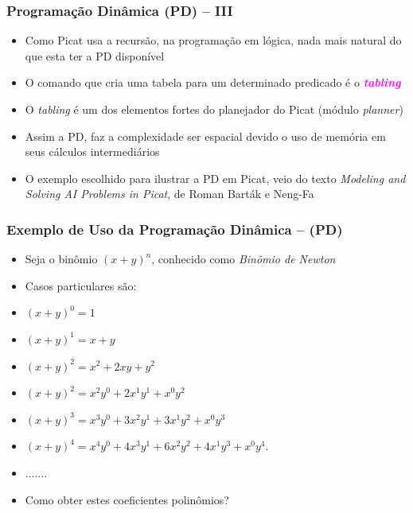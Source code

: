 \begin{frame}[fragile]

    \frametitle{Programação Dinâmica (PD) -- III}

   \begin{block}{}
     \begin{itemize}

      \item Como Picat usa a recursão, na programação em lógica, nada mais
      natural do que esta ter a PD disponível 

       \pause
       \item O comando que cria uma tabela para um determinado predicado é o  \textcolor{magenta}{\textbf{\textit{tabling}}}
 
        \pause
       \item O \textit{tabling}  é um dos elementos fortes do planejador do Picat (módulo \textit{planner})

        \pause
       \item Assim a PD, faz a complexidade ser espacial devido o uso de memória em seus cálculos intermediários

        \pause
       \item O exemplo escolhido para ilustrar a PD em Picat, veio do texto \textit{Modeling and Solving AI
        Problems in Picat}, de Roman Barták e Neng-Fa
    \end{itemize}
    
    \end{block}
    
\end{frame}



\begin{frame}[fragile]

\frametitle{Exemplo de Uso da Programação Dinâmica -- (PD)}

\begin{itemize}
  \item Seja o binômio ${\left(x + y\right)}^n$, conhecido como \textit{Binômio de Newton}

  \pause 
  \item Casos particulares são:
  \item  ${\left(x + y\right)}^0 = 1$
  \item  ${\left(x + y\right)}^1 = x + y$
  \item  ${\left(x + y\right)}^2 = x^2 + 2xy + y^2$
  
  \pause
  \item  ${\left(x + y\right)}^2 = x^2y^0 + 2x^1y^1 + x^0y^2$
  \item  ${\left(x + y\right)}^3 = x^3y^0 + 3x^2y^1 + 3x^1y^2 + x^0y^3$
  \item  ${\left(x + y\right)}^4 = x^4y^0 + 4x^3y^1 + 6x^2y^2 + 4x^1y^3 + x^0y^4.$
  \item  .......
  \pause
 \item Como obter estes coeficientes  polinômios?  

\end{itemize}
    
\end{frame}



